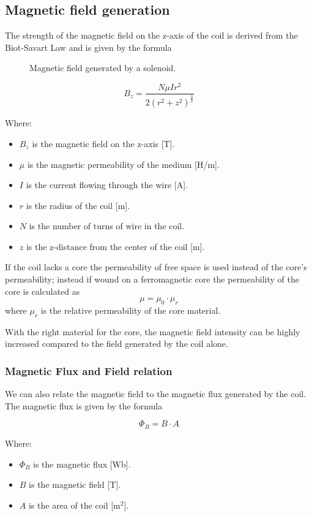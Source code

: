 \subsection{Magnetic field generation}
The strength of the magnetic field on the z-axis of the coil is derived from the Biot-Savart Law and is given by the formula
\begin{figure}
  \centering
  \resizebox{.7\linewidth}{!}{}
  \caption{Magnetic field generated by a solenoid.}
  \label{fig:Coil_magnetic_field}
\end{figure}


\begin{equation}
  B_z=\frac{N\mu Ir^2}{2(r^2+z^2)^\frac{3}{2}} \label{eq:Coil_magn_field}
\end{equation}


Where:
\begin{itemize}
  \item \( B_z \) is the magnetic field on the z-axis [T].
  \item \( \mu \) is the magnetic permeability of the medium [H/m].
  \item \( I \) is the current flowing through the wire [A].
  \item \( r \) is the radius of the coil [m].
  \item \( N \) is the number of turns of wire in the coil.
  \item \( z \) is the z-distance from the center of the coil [m].
\end{itemize}

If the coil lacks a core the permeability of free space is used instead of the core's permeability; instead if wound on a ferromagnetic core the permeability of the core is calculated as
\[\mu = \mu_0 \cdot \mu_r\]
where \( \mu_r \) is the relative permeability of the core material.

With the right material for the core, the magnetic field intensity can be highly increased compared to the field generated by the coil alone.


\subsubsection{Magnetic Flux and Field relation}
We can also relate the magnetic field to the magnetic flux generated by the coil. The magnetic flux is given by the formula

\begin{equation}
  \Phi_B=B \cdot A \label{eq:Magnetic_flux_&_field}
\end{equation}

Where:
\begin{itemize}
  \item \( \Phi_B \) is the magnetic flux [Wb].
  \item \( B \) is the magnetic field [T].
  \item \( A \) is the area of the coil [m\(^2\)].
\end{itemize}